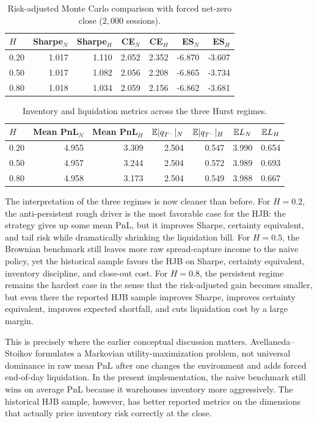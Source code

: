 \begin{table}[H]
\centering
\caption{Risk-adjusted Monte Carlo comparison with forced net-zero close (\(2{,}000\) sessions).}
\label{hft2-tab:hjb_mc_risk}
\begin{tabular}{@{}lrrrrrr@{}}
\toprule
\(H\) & Sharpe\(_N\) & Sharpe\(_H\) & CE\(_N\) & CE\(_H\) & ES\(_N\) & ES\(_H\) \\
\midrule
0.20 & 1.017 & 1.110 & 2.052 & 2.352 & -6.870 & -3.607 \\
0.50 & 1.017 & 1.082 & 2.056 & 2.208 & -6.865 & -3.734 \\
0.80 & 1.018 & 1.034 & 2.059 & 2.156 & -6.862 & -3.681 \\
\bottomrule
\end{tabular}
\end{table}

\begin{table}[H]
\centering
\caption{Inventory and liquidation metrics across the three Hurst regimes.}
\label{hft2-tab:hjb_mc_inventory}
\begin{tabular}{@{}lrrrrrr@{}}
\toprule
\(H\) & Mean PnL\(_N\) & Mean PnL\(_H\) & \(\mathbb{E}|q_{T^-}|_N\) & \(\mathbb{E}|q_{T^-}|_H\) & \(\mathbb{E} L_N\) & \(\mathbb{E} L_H\) \\
\midrule
0.20 & 4.955 & 3.309 & 2.504 & 0.547 & 3.990 & 0.654 \\
0.50 & 4.957 & 3.244 & 2.504 & 0.572 & 3.989 & 0.693 \\
0.80 & 4.958 & 3.173 & 2.504 & 0.549 & 3.988 & 0.667 \\
\bottomrule
\end{tabular}
\end{table}

The interpretation of the three regimes is now cleaner than before. For \(H=0.2\), the anti-persistent rough driver is the most favorable case for the HJB: the strategy gives up some mean PnL, but it improves Sharpe, certainty equivalent, and tail risk while dramatically shrinking the liquidation bill. For \(H=0.5\), the Brownian benchmark still leaves more raw spread-capture income to the naive policy, yet the historical sample favors the HJB on Sharpe, certainty equivalent, inventory discipline, and close-out cost. For \(H=0.8\), the persistent regime remains the hardest case in the sense that the risk-adjusted gain becomes smaller, but even there the reported HJB sample improves Sharpe, improves certainty equivalent, improves expected shortfall, and cuts liquidation cost by a large margin.

This is precisely where the earlier conceptual discussion matters. Avellaneda--Stoikov formulates a Markovian utility-maximization problem, not universal dominance in raw mean PnL after one changes the environment and adds forced end-of-day liquidation. In the present implementation, the naive benchmark still wins on average PnL because it warehouses inventory more aggressively. The historical HJB sample, however, has better reported metrics on the dimensions that actually price inventory risk correctly at the close.


